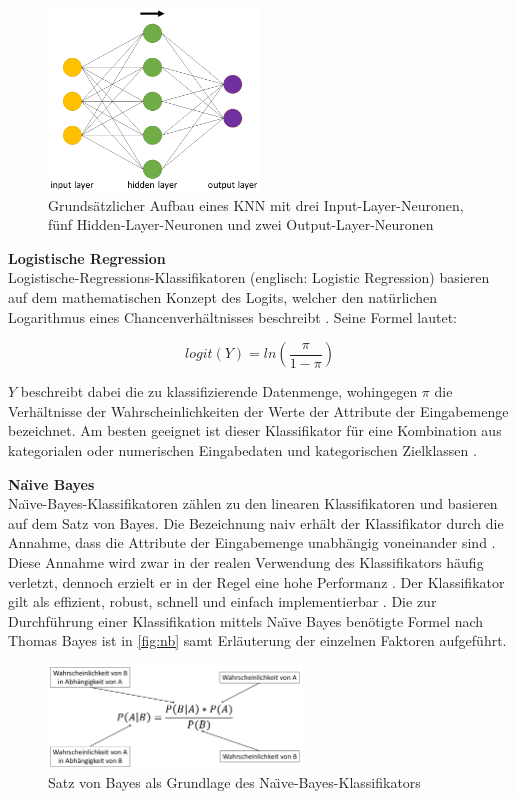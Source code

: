 \begin{figure}[t]
    \centering
    \includegraphics[width=0.5\textwidth]{images/ANN}
    \caption{Grundsätzlicher Aufbau eines KNN mit drei Input-Layer-Neuronen, fünf Hidden-Layer-Neuronen und zwei Output-Layer-Neuronen\label{fig:ann}}
\end{figure}

\textbf{Logistische Regression\medskip}\\
Logistische-Regressions-Klassifikatoren (englisch: Logistic Regression) basieren auf dem mathematischen Konzept des Logits, welcher den natürlichen Logarithmus eines Chancenverhältnisses beschreibt \cite{Peng2002}. Seine Formel lautet:

\[logit(Y) = ln(\frac{\pi}{1-\pi})\]

$Y$ beschreibt dabei die zu klassifizierende Datenmenge, wohingegen $\pi$ die Verhältnisse der Wahrscheinlichkeiten der Werte der Attribute der Eingabemenge bezeichnet. Am besten geeignet ist dieser Klassifikator für eine Kombination aus kategorialen oder numerischen Eingabedaten und kategorischen Zielklassen \cite{Peng2002}.

\textbf{Na\"{\i}ve Bayes\medskip}\\
Na\"{\i}ve-Bayes-Klassifikatoren zählen zu den linearen Klassifikatoren und basieren auf dem Satz von Bayes. Die Bezeichnung \glqq naiv\grqq{} erhält der Klassifikator durch die Annahme, dass die Attribute der Eingabemenge unabhängig voneinander sind \cite{Raschka2014}. Diese Annahme wird zwar in der realen Verwendung des Klassifikators häufig verletzt, dennoch erzielt er in der Regel eine hohe Performanz \cite{Raschka2014}. Der Klassifikator gilt als effizient, robust, schnell und einfach implementierbar \cite{Raschka2014}. Die zur Durchführung einer Klassifikation mittels Na\"{\i}ve Bayes benötigte Formel nach Thomas Bayes ist in \autoref{fig:nb} samt Erläuterung der einzelnen Faktoren aufgeführt.

\begin{figure}[t]
    \centering
    \includegraphics[width=0.6\textwidth]{images/NB}
    \caption{Satz von Bayes als Grundlage des Na\"{\i}ve-Bayes-Klassifikators\label{fig:nb}}
\end{figure}

